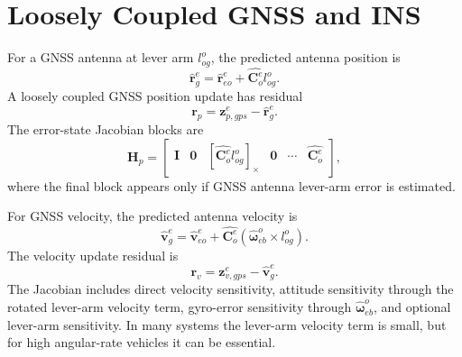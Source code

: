 \documentclass[11pt,oneside]{book}
\renewcommand{\skew}[1]{\left[#1\right]_{\times}}
\newcommand{\vb}{\mathbf{v}}
\newcommand{\rb}{\mathbf{r}}
\newcommand{\I}{\mathbf{I}}
\newcommand{\zero}{\mathbf{0}}
\newcommand{\Coe}{\mathbf{C}^{e}_{o}}
\begin{document}
\section{Loosely Coupled GNSS and INS}
For a GNSS antenna at lever arm $l_{og}^o$, the predicted antenna position is
\begin{equation}
\hat{\rb}_g^e=\hat{\rb}_{eo}^e+\hat{\Coe}l_{og}^o.
\end{equation}
A loosely coupled GNSS position update has residual
\begin{equation}
\mathbf{r}_p=\mathbf{z}_{p,gps}^e-\hat{\rb}_g^e.
\end{equation}
The error-state Jacobian blocks are
\begin{equation}
\mathbf{H}_{p}=\begin{bmatrix}
\I & \zero & \skew{\hat{\Coe}l_{og}^o} & \zero & \cdots & \hat{\Coe}
\end{bmatrix},
\end{equation}
where the final block appears only if GNSS antenna lever-arm error is estimated.

For GNSS velocity, the predicted antenna velocity is
\begin{equation}
\hat{\vb}_g^e=\hat{\vb}_{eo}^e+\hat{\Coe}\left(\hat{\boldsymbol\omega}_{eb}^o\times l_{og}^o\right).
\end{equation}
The velocity update residual is
\begin{equation}
\mathbf{r}_v=\mathbf{z}_{v,gps}^e-\hat{\vb}_g^e.
\end{equation}
The Jacobian includes direct velocity sensitivity, attitude sensitivity through the rotated lever-arm velocity term, gyro-error sensitivity through $\hat{\boldsymbol\omega}_{eb}^o$, and optional lever-arm sensitivity. In many systems the lever-arm velocity term is small, but for high angular-rate vehicles it can be essential.
\end{document}
